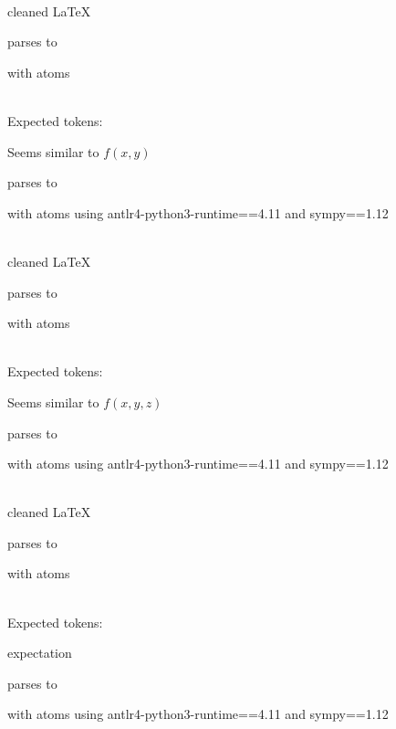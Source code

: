 \documentclass{article}
\begin{document}
\ \\
cleaned \LaTeX

parses to

with atoms


\ \\
Expected tokens:



\hrulefill


Seems similar to $f(x, y)$

parses to

with atoms
using antlr4-python3-runtime==4.11 and sympy==1.12

\ \\
cleaned \LaTeX

parses to

with atoms


\ \\
Expected tokens:




\hrulefill

Seems similar to $f(x, y, z)$

parses to

with atoms
using antlr4-python3-runtime==4.11 and sympy==1.12

\ \\
cleaned \LaTeX

parses to

with atoms


\ \\
Expected tokens:




\hrulefill


expectation

parses to

with atoms
using antlr4-python3-runtime==4.11 and sympy==1.12
\end{document}
